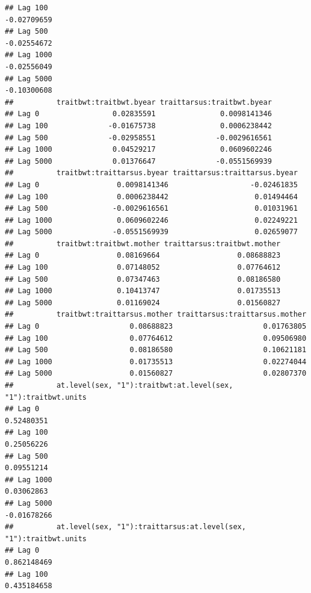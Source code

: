 \documentclass[
  12pt,
]{book}
\begin{document}
\begin{verbatim}
## Lag 100                                                           -0.02709659
## Lag 500                                                           -0.02554672
## Lag 1000                                                          -0.02556049
## Lag 5000                                                          -0.10300608
##          traitbwt:traitbwt.byear traittarsus:traitbwt.byear
## Lag 0                 0.02835591               0.0098141346
## Lag 100              -0.01675738               0.0006238442
## Lag 500              -0.02958551              -0.0029616561
## Lag 1000              0.04529217               0.0609602246
## Lag 5000              0.01376647              -0.0551569939
##          traitbwt:traittarsus.byear traittarsus:traittarsus.byear
## Lag 0                  0.0098141346                   -0.02461835
## Lag 100                0.0006238442                    0.01494464
## Lag 500               -0.0029616561                    0.01031961
## Lag 1000               0.0609602246                    0.02249221
## Lag 5000              -0.0551569939                    0.02659077
##          traitbwt:traitbwt.mother traittarsus:traitbwt.mother
## Lag 0                  0.08169664                  0.08688823
## Lag 100                0.07148052                  0.07764612
## Lag 500                0.07347463                  0.08186580
## Lag 1000               0.10413747                  0.01735513
## Lag 5000               0.01169024                  0.01560827
##          traitbwt:traittarsus.mother traittarsus:traittarsus.mother
## Lag 0                     0.08688823                     0.01763805
## Lag 100                   0.07764612                     0.09506980
## Lag 500                   0.08186580                     0.10621181
## Lag 1000                  0.01735513                     0.02274044
## Lag 5000                  0.01560827                     0.02807370
##          at.level(sex, "1"):traitbwt:at.level(sex, "1"):traitbwt.units
## Lag 0                                                       0.52480351
## Lag 100                                                     0.25056226
## Lag 500                                                     0.09551214
## Lag 1000                                                    0.03062863
## Lag 5000                                                   -0.01678266
##          at.level(sex, "1"):traittarsus:at.level(sex, "1"):traitbwt.units
## Lag 0                                                         0.862148469
## Lag 100                                                       0.435184658

\end{verbatim}
\end{document}
